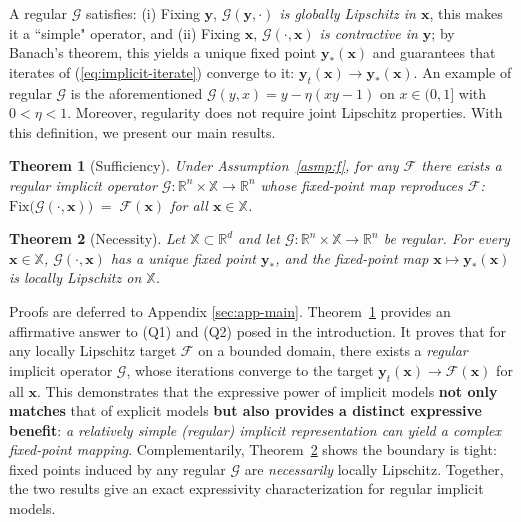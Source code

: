 \documentclass{amsart} %
\def\eqref#1{equation~\ref{#1}}
\def\vx{{\bm{x}}}
\def\vy{{\bm{y}}}
\def\sR{{\mathbb{R}}}
\def\sX{{\mathbb{X}}}
\def\cF{{\mathcal{F}}}
\def\cG{{\mathcal{G}}}
\newtheorem{theorem}{Theorem}[section]
\theoremstyle{definition}
\theoremstyle{remark}
\renewcommand{\eqref}[1]{\textup{(\ref{#1})}}
\begin{document}
A regular $\cG$ satisfies: (i) Fixing $\vy$, \textit{$\cG(\vy,\cdot)$ is globally Lipschitz in $\vx$}, this makes it a ``simple" operator, and (ii) Fixing $\vx$, \textit{$\cG(\cdot,\vx)$ is contractive in $\vy$}; by Banach’s theorem, this yields a unique fixed point $\vy_\ast(\vx)$ and guarantees that iterates of \eqref{eq:implicit-iterate} converge to it: $\vy_t(\vx) \to \vy_\ast(\vx)$. An example of regular $\cG$ is the aforementioned $\cG(y,x)=y-\eta(xy-1)$ on $x \in (0,1]$ with $0<\eta<1$. Moreover, regularity does not require joint Lipschitz properties.
With this definition, we present our main results.

\begin{theorem}[Sufficiency]
\label{thm:lip}
Under Assumption~\ref{asmp:f}, for any $\cF$ there exists a \emph{regular} implicit operator $\cG:\sR^n\times\sX\to\sR^n$ whose fixed-point map reproduces $\cF$: $\mathrm{Fix}\big(\cG(\cdot,\vx)\big)\;=\;\cF(\vx)$ for all $\vx\in\sX$.
\end{theorem}

\begin{theorem}[Necessity]
\label{thm:lip-2}
Let $\sX\subset\sR^d$ and let $\cG:\sR^n\times\sX\to\sR^n$ be \emph{regular}. For every $\vx\in\sX$, $\cG(\cdot,\vx)$ has a unique fixed point $\vy_\ast$, and the fixed-point map $\vx\mapsto\vy_\ast(\vx)$ is locally Lipschitz on $\sX$.
\end{theorem}


Proofs are deferred to Appendix \ref{sec:app-main}. Theorem~\ref{thm:lip} provides an affirmative answer to (Q1) and (Q2) posed in the introduction. It proves that for any locally Lipschitz target $\cF$ on a bounded domain, there exists a \textit{regular} implicit operator $\cG$, whose iterations converge to the target $\vy_t(\vx)\to\cF(\vx)$ for all $\vx$. This demonstrates that the expressive power of implicit models \textbf{not only matches} that of explicit models \textbf{but also provides a distinct expressive benefit}: \textit{a relatively simple (regular) implicit representation can yield a complex fixed-point mapping}. Complementarily, Theorem~\ref{thm:lip-2} shows the boundary is tight: fixed points induced by any regular $\cG$ are \emph{necessarily} locally Lipschitz. Together, the two results give an exact expressivity characterization for regular implicit models.
\end{document}

